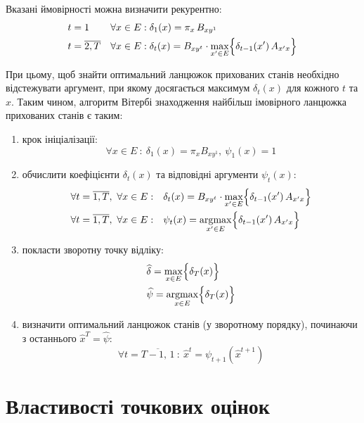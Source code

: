Вказані ймовірності можна визначити рекурентно:
\begin{align*}
    & t = 1              && \forall x \in E: \delta_1(x)=\pi_{x}\,B_{xy^1} \\
    & t = \overline{2,T} && \forall x \in E: \delta_{t}(x)=B_{xy^{t}}\cdot\max_{x' \in E}\Bigl\{ \delta_{t-1}(x')\,A_{x'x} \Bigr\}
\end{align*}

При цьому, щоб знайти оптимальний ланцюжок прихованих станів необхідно відстежувати аргумент, при якому досягається максимум $\delta_t(x)$ для кожного $t$ та $x$. Таким чином, алгоритм Вітербі знаходження найбільш імовірного ланцюжка прихованих станів є таким:

\begin{enumerate}
    \item крок ініціалізації:
    \begin{equation*}
        \forall x \in E\ :\ \delta_1(x)=\pi_{x}B_{xy^1}, \ \psi_1(x)=1
    \end{equation*}    
    \item обчислити коефіцієнти $\delta_t(x)$ та відповідні аргументи $\psi_t(x):$
    \begin{align*}
        &\forall t=\overline{1,T}, \ \forall x \in E: && \delta_{t}(x)=B_{xy^{t}}\cdot\max_{x'\in E}\Bigl\{\delta_{t-1}(x')\,A_{x'x}\Bigr\} \\
        &\forall t=\overline{1,T}, \ \forall x \in E: && \psi_{t}(x)=\operatorname*{argmax}_{x'\in E}\Bigl\{\delta_{t-1}(x')\,A_{x'x}\Bigr\}
    \end{align*}
    \item покласти зворотну точку відліку:
    \begin{align*}
        &\widehat{\delta}=\max_{x \in E}\Bigl\{\delta_T(x)\Bigr\} \\
        &\widehat{\psi}=\operatorname*{argmax}_{x \in E}\Bigl\{\delta_T(x)\Bigr\}
    \end{align*}
    \item визначити оптимальний ланцюжок станів (у зворотному порядку), починаючи з останнього $\widehat{x}^T=\widehat{\psi}:$
    \begin{equation*}
        \forall t=\overline{T-1,\,1}\ :\ \widehat{x}^t=\psi_{t+1}(\widehat{x}^{t+1})
    \end{equation*}
\end{enumerate}

\section{Властивості точкових оцінок}

